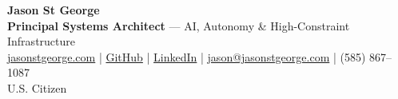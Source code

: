\documentclass[10.5pt]{res}
\begin{document}
\name{}
\makeatletter\def\@opening{}\makeatother

\begin{center}
{\Huge \textbf{Jason St George}}\\[0.18cm]
{\fontsize{10.5}{13}\selectfont
\textbf{Principal Systems Architect} --- AI, Autonomy \& High-Constraint Infrastructure\\[0.13cm]
\href{https://jasonstgeorge.com}{jasonstgeorge.com} | \href{https://github.com/ifrit98}{GitHub} | \href{https://linkedin.com/in/stgeorgejas}{LinkedIn} | \href{mailto:jason@jasonstgeorge.com}{jason@jasonstgeorge.com} | (585) 867--1087\\[0.08cm]
U.S. Citizen}
\end{center}
\vspace{-0.16cm}\hrulefill\vspace{0.16cm}
\end{document}
